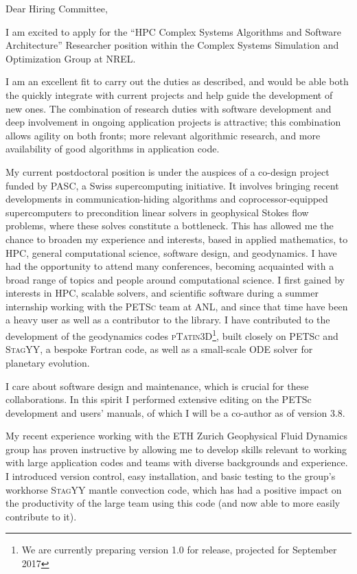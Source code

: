 \documentclass{letter}
\begin{document}
\begin{letter}{}
\opening{Dear Hiring Committee,}

I am excited to apply for the ``HPC Complex Systems Algorithms and Software Architecture'' Researcher position within the Complex Systems Simulation and Optimization Group at NREL.

I am an excellent fit to carry out the duties as described, and would be able both the quickly integrate with current projects and help guide the development of new ones.
The combination of research duties with software development and deep involvement in ongoing application projects is attractive; this combination allows agility on both fronts; more relevant algorithmic research, and more availability of good algorithms in application code.

  My current postdoctoral position is under the auspices of a co-design project funded by PASC, a Swiss supercomputing initiative. It involves bringing recent developments in communication-hiding algorithms and coprocessor-equipped supercomputers to precondition linear solvers in geophysical Stokes flow problems, where these solves constitute a bottleneck. This has allowed me the chance to broaden my experience and interests, based in applied mathematics, to  HPC, general computational science, software design, and geodynamics. I have had the opportunity to attend many conferences, becoming acquainted with a broad range of topics and people around computational science.
  I first gained by interests in HPC, scalable solvers, and scientific software during a summer internship working with the \textsc{PETSc} team at ANL, and since that time have been a heavy user as well as a contributor to the library.
  I have contributed to the development of the geodynamics codes \textsc{pTatin3D}\footnote{We are currently preparing version 1.0 for release, projected for September 2017}, built closely on \textsc{PETSc} and \textsc{StagYY}, a bespoke Fortran code, as well as a small-scale ODE solver for planetary evolution.

I care about software design and maintenance, which is crucial for these collaborations. In this spirit I performed extensive editing on the PETSc development and users' manuals, of which I will be a co-author as of version 3.8.

  My recent experience working with the ETH Zurich Geophysical Fluid Dynamics group has proven instructive by allowing me to develop skills relevant to working with large application codes and teams with diverse backgrounds and experience. I introduced version control, easy installation, and basic testing to the group's workhorse \textsc{StagYY} mantle convection code, which has had a positive impact on the productivity of the large team using this code (and now able to more easily contribute to it).


\end{letter}
\end{document}
